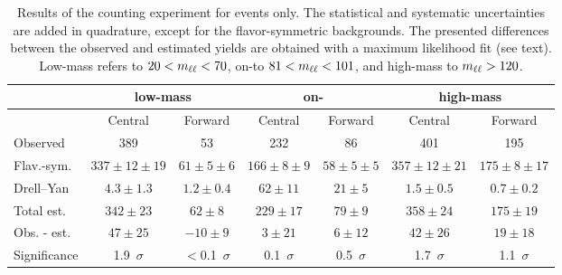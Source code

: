 
\begin{table}[hbtp]
 \renewcommand{\arraystretch}{1.3}
 \setlength{\belowcaptionskip}{6pt}
 \scriptsize
 \centering
 \caption{Results of the counting experiment for \EE events only.
     The statistical and systematic uncertainties are added in quadrature, except for the flavor-symmetric backgrounds. The presented differences between the observed and estimated yields are obtained with a maximum likelihood fit (see text).    Low-mass refers to $20 < m_{\ell\ell} < 70$\GeV, on-\Z to  $81 < m_{\ell\ell} < 101$\GeV, and high-mass to $m_{\ell\ell} > 120$\GeV.
     }
  \label{tab:METresults2012EE}
  \begin{tabular}{l| cc | cc | cc}

    							& \multicolumn{2}{c}{low-mass} & \multicolumn{2}{c}{on-\Z} & \multicolumn{2}{c}{high-mass} \\ 

    \hline
                                &  Central        & Forward  &  Central  & Forward   &  Central        & Forward \\ 

    \hline
        Observed       &  389                   & 53              &  232            &  86       &   401           &   195    \\

    \hline
        Flav.-sym.    & $337\pm12\pm19$        & $61\pm5\pm6$  &  $166\pm8\pm9$ & $58\pm5\pm5$ & $357\pm12\pm21$ & $175\pm8\pm17$ \\

            Drell--Yan          & $4.3\pm1.3$            & $1.2\pm0.4$      & $62\pm11$ & $21\pm5$ & $1.5\pm0.5$ & $0.7\pm0.2$ \\

    \hline
            Total est.          & $342\pm23$            & $62\pm8$      & $229\pm17$ & $79\pm9$ & $358\pm24$ & $175\pm19$ \\

    \hline
         Obs. - est.  & $47\pm25$      & $-10\pm9$ & $3\pm21 $ & $6\pm12$ & $42\pm26$ & $19\pm18 $ \\ 

    \hline
   Significance      & 1.9~$\sigma$    &  $<$0.1~$\sigma$  & 0.1~$\sigma$ & 0.5~$\sigma$ & 1.7~$\sigma$ & 1.1~$\sigma$ \\ 


  \end{tabular}
\end{table}


